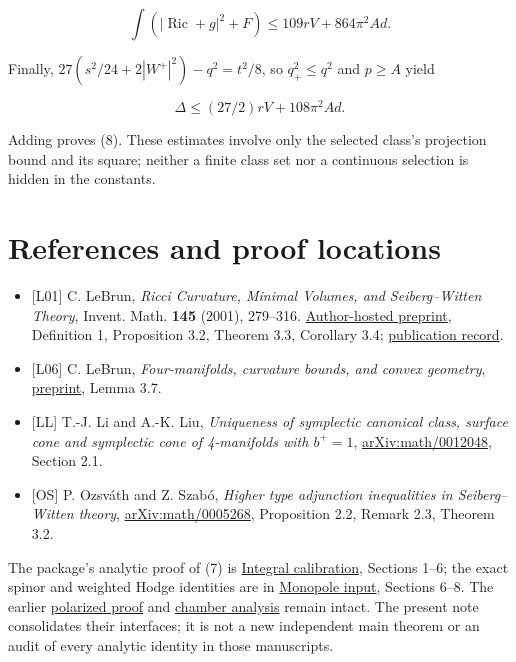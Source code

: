 \documentclass[
  11pt,
]{article}
\providecommand{\tightlist}{%
  \setlength{\itemsep}{0pt}\setlength{\parskip}{0pt}}
\begin{document}
\[
\int(|\operatorname{Ric}+g|^2+F)
 \le109rV+864\pi^2Ad.
\]

Finally, \(27(s^2/24+2|W^+|^2)-q^2=t^2/8\), so \(q_+^2\le q^2\) and
\(p\ge A\) yield

\[
\Delta\le(27/2)rV+108\pi^2Ad.
\]

Adding proves (8). These estimates involve only the selected class's
projection bound and its square; neither a finite class set nor a
continuous selection is hidden in the constants.

\hypertarget{references-and-proof-locations}{%
\section{References and proof
locations}\label{references-and-proof-locations}}

\begin{itemize}
\tightlist
\item
  {[}L01{]} C. LeBrun, \emph{Ricci Curvature, Minimal Volumes, and
  Seiberg--Witten Theory}, Invent. Math. \textbf{145} (2001), 279--316.
  \href{https://www.math.stonybrook.edu/~claude/min.pdf}{Author-hosted
  preprint}, Definition 1, Proposition 3.2, Theorem 3.3, Corollary 3.4;
  \href{https://doi.org/10.1007/s002220100148}{publication record}.
\item
  {[}L06{]} C. LeBrun, \emph{Four-manifolds, curvature bounds, and
  convex geometry}, \href{https://arxiv.org/abs/math/0611450}{preprint},
  Lemma 3.7.
\item
  {[}LL{]} T.-J. Li and A.-K. Liu, \emph{Uniqueness of symplectic
  canonical class, surface cone and symplectic cone of 4-manifolds with
  \(b^+=1\)},
  \href{https://arxiv.org/abs/math/0012048}{arXiv:math/0012048}, Section
  2.1.
\item
  {[}OS{]} P. Ozsváth and Z. Szabó, \emph{Higher type adjunction
  inequalities in Seiberg--Witten theory},
  \href{https://arxiv.org/abs/math/0005268}{arXiv:math/0005268},
  Proposition 2.2, Remark 2.3, Theorem 3.2.
\end{itemize}

The package's analytic proof of (7) is
\href{round4_rigidity.md}{Integral calibration}, Sections 1--6; the
exact spinor and weighted Hodge identities are in
\href{round3_monopole_input.md}{Monopole input}, Sections 6--8. The
earlier \href{round13_chamber.md}{polarized proof} and
\href{round21_chambers.md}{chamber analysis} remain intact. The present
note consolidates their interfaces; it is not a new independent main
theorem or an audit of every analytic identity in those manuscripts.
\end{document}
